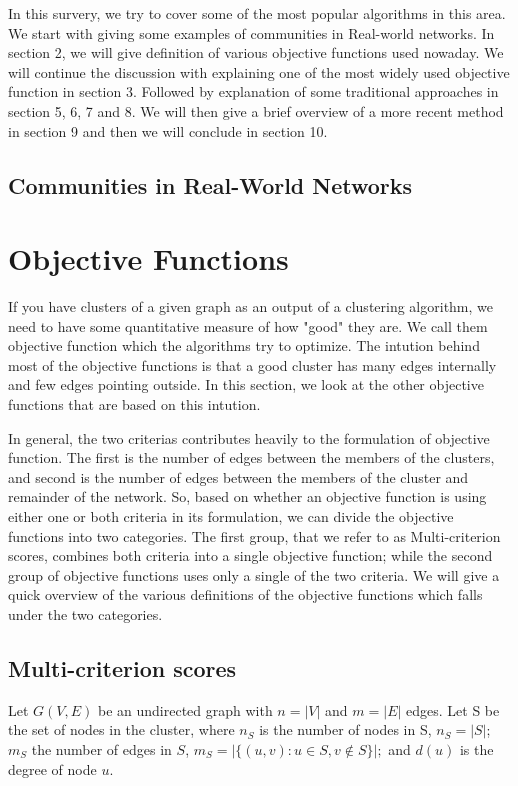 \documentclass[letterpaper]{article}
\begin{document}
In this survery, we try to cover some of the most popular algorithms in this
area. We start with giving some examples of communities in Real-world networks.
In section 2, we will give definition of various objective functions used
nowaday. We will continue the discussion with explaining one of the most widely
used objective function in section 3. Followed by explanation of some
traditional approaches in section 5, 6, 7 and 8. We will then give a brief
overview of a more recent method in section 9 and then we will conclude in
section 10.
\subsection{Communities in Real-World Networks}
\section{Objective Functions}
If you have clusters of a given graph as an output of a clustering algorithm,
we need to have some quantitative measure of how "good" they are. We call them
objective function which the algorithms try to optimize. The intution behind
most of the objective functions is that a good cluster has many edges
internally and few edges pointing outside. In this section, we look at the
other objective functions that are based on this intution.


In general, the two criterias contributes heavily to the formulation of
objective function. The first is the number of edges between the members of the
clusters, and second is the number of edges between the members of the cluster
and remainder of the network. So, based on whether an objective function is
using either one or both criteria in its formulation, we can divide the
objective functions into two categories\cite{leskovec2010}. The first group,
that we refer to as Multi-criterion scores, combines both criteria into a
single objective function; while the second group of objective functions uses
only  a single of the two criteria. We will give a quick overview of the
various definitions of the objective functions which falls under the two
categories.


\subsection{Multi-criterion scores}
Let $G(V,E)$ be an undirected graph with $n=|V|$ and $m=|E|$ edges. Let S be the set of nodes in the cluster, where $n_S$ is the number of nodes in S,
$n_S=|S|$; $m_S$ the number of edges in $S$,  $m_S=|\{(u,v):u\in S, v\notin S\}|;$ and $d(u)$ is the degree of node $u$.
\end{document}
